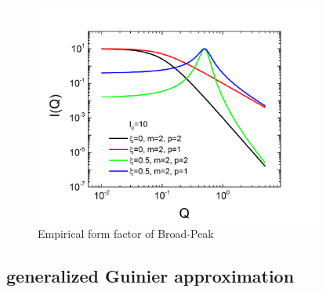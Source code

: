 \begin{figure}[htb]
\begin{center}
\includegraphics[width=0.85\textwidth]{BroadPeak.png}
\end{center}
\caption{Empirical form factor of Broad-Peak} \label{fig:BroadPeakIq}
\end{figure}

\clearpage
\subsection{generalized Guinier approximation \cite{Fratzl1994,Hjelm1992,Hjelm1995,Hjelm2000}}
\label{sec:generalizedGuinier}  ~\\

